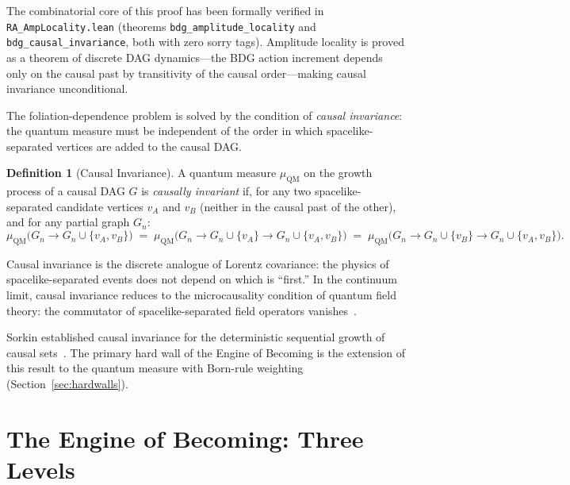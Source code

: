 \documentclass[11pt,a4paper]{article}
\theoremstyle{plain}
\theoremstyle{definition}
\newtheorem{definition}[theorem]{Definition}
\theoremstyle{remark}
\newcommand{\muC}{\mu_{\mathrm{QM}}}   %
\begin{document}
\noindent The combinatorial core of this proof has been formally verified in
\texttt{RA\_AmpLocality.lean} (theorems \texttt{bdg\_amplitude\_locality}
and \texttt{bdg\_causal\_invariance}, both with
zero sorry tags). Amplitude locality is proved as a theorem of discrete
DAG dynamics---the BDG action increment depends only on the causal past
by transitivity of the causal order---making causal invariance
unconditional.



The foliation-dependence problem is solved by the condition of \emph{causal
invariance}: the quantum measure must be independent of the order in which
spacelike-separated vertices are added to the causal DAG.

\begin{definition}[Causal Invariance]
A quantum measure $\muC$ on the growth process of a causal DAG $G$ is
\emph{causally invariant} if, for any two spacelike-separated candidate
vertices $v_A$ and $v_B$ (neither in the causal past of the other), and
for any partial graph $G_n$:
\begin{equation}
  \muC\bigl(G_n \to G_n \cup \{v_A, v_B\}\bigr)
  \;=\;
  \muC\bigl(G_n \to G_n \cup \{v_A\} \to G_n \cup \{v_A, v_B\}\bigr)
  \;=\;
  \muC\bigl(G_n \to G_n \cup \{v_B\} \to G_n \cup \{v_A, v_B\}\bigr).
  \label{eq:causal_invariance}
\end{equation}
\end{definition}

Causal invariance is the discrete analogue of Lorentz covariance: the physics
of spacelike-separated events does not depend on which is ``first.'' In the
continuum limit, causal invariance reduces to the microcausality condition of
quantum field theory: the commutator of spacelike-separated field operators
vanishes~\citep{Haag1996}.

Sorkin established causal invariance for the deterministic sequential growth
of causal sets~\citep{RideoutSorkin2000}. The primary hard wall of the Engine
of Becoming is the extension of this result to the quantum measure with
Born-rule weighting (Section~\ref{sec:hardwalls}).

\section{The Engine of Becoming: Three Levels}
\label{sec:algorithm}
\end{document}

